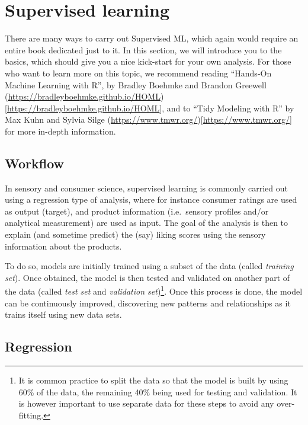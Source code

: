 \documentclass[
]{krantz}
\begin{document}
\hypertarget{supervised-learning}{%
\section{Supervised learning}\label{supervised-learning}}

There are many ways to carry out Supervised ML, which again would require an entire book dedicated just to it. In this section, we will introduce you to the basics, which should give you a nice kick-start for your own analysis. For those who want to learn more on this topic, we recommend reading ``Hands-On Machine Learning with R'', by Bradley Boehmke and Brandon Greewell (\url{https://bradleyboehmke.github.io/HOML}){[}\url{https://bradleyboehmke.github.io/HOML}{]}, and to ``Tidy Modeling with R'' by Max Kuhn and Sylvia Silge (\url{https://www.tmwr.org/}){[}\url{https://www.tmwr.org/}{]} for more in-depth information.

\hypertarget{workflow}{%
\subsection{Workflow}\label{workflow}}

In sensory and consumer science, supervised learning is commonly carried out using a regression type of analysis, where for instance consumer ratings are used as output (target), and product information (i.e.~sensory profiles and/or analytical measurement) are used as input. The goal of the analysis is then to explain (and sometime predict) the (say) liking scores using the sensory information about the products.

To do so, models are initially trained using a subset of the data (called \emph{training set}). Once obtained, the model is then tested and validated on another part of the data (called \emph{test set} and \emph{validation set})\footnote{It is common practice to split the data so that the model is built by using 60\% of the data, the remaining 40\% being used for testing and validation. It is however important to use separate data for these steps to avoid any over-fitting.}. Once this process is done, the model can be continuously improved, discovering new patterns and relationships as it trains itself using new data sets.

\hypertarget{regression}{%
\subsection{Regression}\label{regression}}
\end{document}
